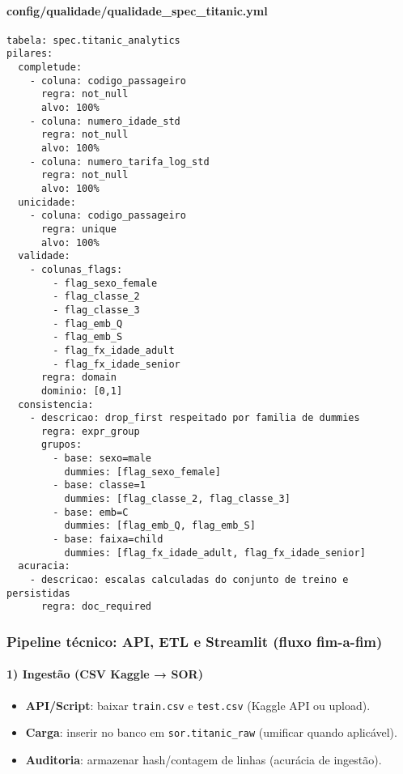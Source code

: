 \documentclass[12pt,a4paper]{article}
\begin{document}
\paragraph{config/qualidade/qualidade\_spec\_titanic.yml}
\begin{verbatim}
tabela: spec.titanic_analytics
pilares:
  completude:
    - coluna: codigo_passageiro
      regra: not_null
      alvo: 100%
    - coluna: numero_idade_std
      regra: not_null
      alvo: 100%
    - coluna: numero_tarifa_log_std
      regra: not_null
      alvo: 100%
  unicidade:
    - coluna: codigo_passageiro
      regra: unique
      alvo: 100%
  validade:
    - colunas_flags:
        - flag_sexo_female
        - flag_classe_2
        - flag_classe_3
        - flag_emb_Q
        - flag_emb_S
        - flag_fx_idade_adult
        - flag_fx_idade_senior
      regra: domain
      dominio: [0,1]
  consistencia:
    - descricao: drop_first respeitado por familia de dummies
      regra: expr_group
      grupos:
        - base: sexo=male
          dummies: [flag_sexo_female]
        - base: classe=1
          dummies: [flag_classe_2, flag_classe_3]
        - base: emb=C
          dummies: [flag_emb_Q, flag_emb_S]
        - base: faixa=child
          dummies: [flag_fx_idade_adult, flag_fx_idade_senior]
  acuracia:
    - descricao: escalas calculadas do conjunto de treino e persistidas
      regra: doc_required
\end{verbatim}

\subsubsection*{Pipeline técnico: API, ETL e Streamlit (fluxo fim-a-fim)}

\paragraph{1) Ingestão (CSV Kaggle → SOR)}
\begin{itemize}
  \item \textbf{API/Script}: baixar \texttt{train.csv} e \texttt{test.csv} (Kaggle API ou upload).
  \item \textbf{Carga}: inserir no banco em \texttt{sor.titanic\_raw} (umificar quando aplicável).
  \item \textbf{Auditoria}: armazenar hash/contagem de linhas (acurácia de ingestão).
\end{itemize}
\end{document}

